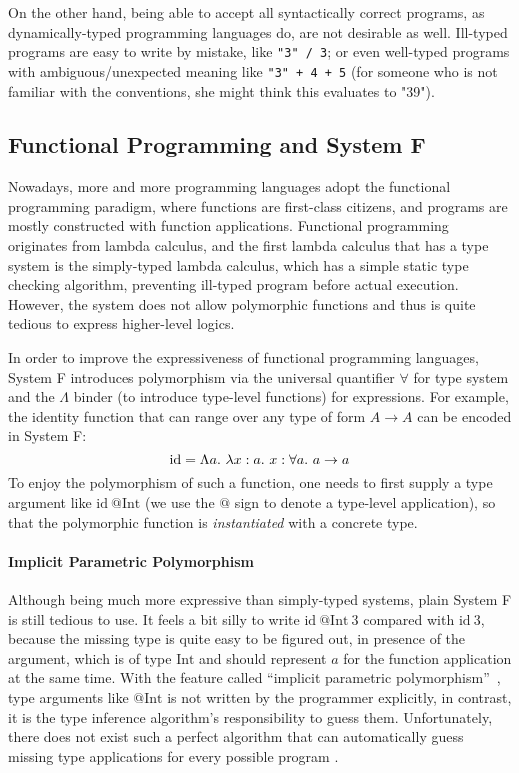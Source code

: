 On the other hand, being able to accept all syntactically correct programs,
as dynamically-typed programming languages do,
are not desirable as well.
Ill-typed programs are easy to write by mistake, like \verb|"3" / 3|;
or even well-typed programs with ambiguous/unexpected meaning like \verb|"3" + 4 + 5|
(for someone who is not familiar with the conventions, she might think this evaluates to "39").


\subsection{Functional Programming and System F}
Nowadays, more and more programming languages adopt the functional programming paradigm,
where functions are first-class citizens,
and programs are mostly constructed with function applications.
Functional programming originates from lambda calculus,
and the first lambda calculus that has a type system is the
simply-typed lambda calculus, which has a simple static type checking algorithm,
preventing ill-typed program before actual execution.
However, the system does not allow polymorphic functions and
thus is quite tedious to express higher-level logics.

In order to improve the expressiveness of functional programming languages,
System F introduces polymorphism via the universal quantifier $\forall$ for type system
and the $\Lambda$ binder (to introduce type-level functions) for expressions.
For example, the identity function that can range over any type of form $A \to A$
can be encoded in System F:
$$\text{id} = \Lambda a.~\lam[x:a]x : \all a \to a$$
To enjoy the polymorphism of such a function,
one needs to first supply a type argument like $\text{id}~@\text{Int}$
(we use the $@$ sign to denote a type-level application),
so that the polymorphic function is \emph{instantiated} with
a concrete type.

\paragraph{Implicit Parametric Polymorphism}

Although being much more expressive than simply-typed systems,
plain System F is still tedious to use.
It feels a bit silly to write $\text{id}~@\text{Int}~3$ compared with $\text{id}~3$,
because the missing type is quite easy to be figured out,
in presence of the argument, which is of type $\text{Int}$ and
should represent $a$ for the function application at the same time.
With the feature called ``implicit parametric polymorphism''~\citep{reynolds1983types},
type arguments like $@\text{Int}$ is not written by the programmer explicitly,
in contrast, it is the type inference algorithm's responsibility to guess them.
Unfortunately, there does not exist such a perfect algorithm that
can automatically guess missing type applications for every possible program .

